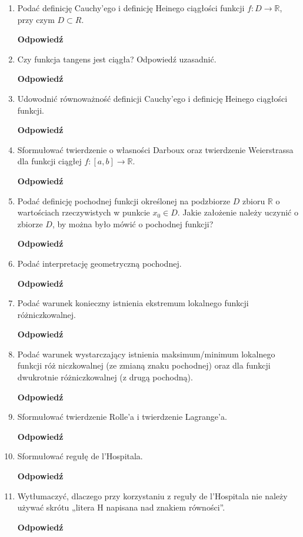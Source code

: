\documentclass[12pt,a4paper]{article}
\newcounter{twierdzenie}
\theoremstyle{break}
\newcommand{\Odp}[1]{
		\begin{mdframed}[style=zadanie]
			\textbf{Odpowiedź}\\
			#1
		\end{mdframed}
	}
\begin{document}
\begin{enumerate}[1.]
	\item Podać definicję Cauchy’ego i definicję Heinego ciągłości funkcji $f : D \rightarrow \mathbb{R}$, przy czym $D \subset R$.
	\Odp{
	
	}
	
	\item Czy funkcja tangens jest ciągła? Odpowiedź uzasadnić.
	\Odp{
		
	}
	
	\item Udowodnić równoważność definicji Cauchy’ego i definicję Heinego ciągłości funkcji.
	\Odp{
	
	}
	
	\item Sformułować twierdzenie o własności Darboux oraz twierdzenie Weierstrassa dla funkcji ciągłej $f : [a, b] \rightarrow \mathbb{R}$.
	\Odp{
	
	}
	
	\item Podać definicję pochodnej funkcji określonej na podzbiorze $D$ zbioru $\mathbb{R}$ o wartościach rzeczywistych w punkcie $x_0 \in D$. Jakie założenie należy uczynić o zbiorze $D$, by można było mówić o pochodnej funkcji?
	\Odp{

	}
	
	\item Podać interpretację geometryczną pochodnej.
	\Odp{
		
	}
	
	\item Podać warunek konieczny istnienia ekstremum lokalnego funkcji różniczkowalnej.
	\Odp{
		
	}
	
	\item Podać warunek wystarczający istnienia maksimum/minimum lokalnego funkcji róż	niczkowalnej (ze zmianą znaku pochodnej) oraz dla funkcji dwukrotnie różniczkowalnej (z drugą pochodną).
	\Odp{
	
	}
	
	\item Sformułować twierdzenie Rolle’a i twierdzenie Lagrange’a.
	\Odp{
	
	}
	
	\item Sformułować regułę de l’Hospitala.
	\Odp{
	
	}
	
	\item Wytłumaczyć, dlaczego przy korzystaniu z reguły de l’Hospitala nie należy używać skrótu „litera H napisana nad znakiem równości”.
	\Odp{
	
}
\end{enumerate}
\end{document}
